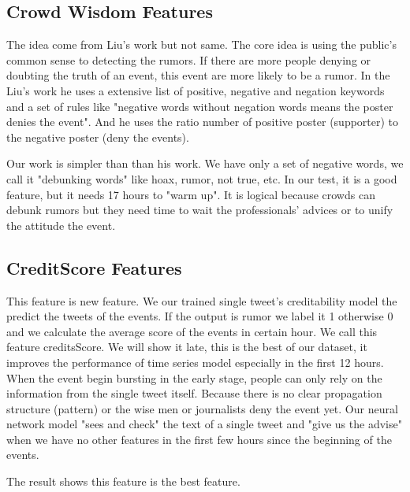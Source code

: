 \clearpage
\subsection{Crowd Wisdom Features}
The idea come from Liu's work \cite{liu2015real} but not same. The core idea is using the public's common sense to detecting the rumors. If there are more people denying or doubting the truth of an event, this event are more likely to be a rumor. 
In the Liu's work he uses a extensive list of positive, negative and negation keywords and a set of rules like "negative words without negation words means the poster denies the event". And he uses the ratio  number of positive  poster (supporter) to the negative poster (deny the events).

Our work is simpler than than his work. We have only a set of negative words, we call it "debunking words" like hoax, rumor, not true, etc.  In our test, it is a good feature, but it needs 17 hours to "warm up". It is logical because crowds can debunk rumors but they need time to wait the professionals' advices or to unify the attitude the event.

\subsection{CreditScore Features}
This feature is new feature. We our trained single tweet's creditability model the predict the tweets of the events. If the output is rumor we label it 1 otherwise 0 and we calculate the average score of the events in certain hour. We call this feature creditsScore. We will show it late, this is the best of our dataset, it improves the  performance of time series model especially in the first 12 hours. When the event begin bursting in the early stage, people can only rely on the information from the single tweet itself. Because there is no clear propagation structure (pattern) or the wise men or journalists deny the event yet. Our neural network model "sees and check" the text of a single tweet and "give us the advise" when we have no other features in the first few hours since the beginning of the events. 

The result shows this feature is the best feature.
 
